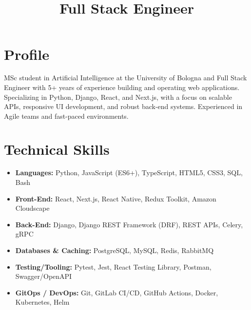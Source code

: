 \documentclass[11pt,a4paper,sans]{moderncv}
\title{Full Stack Engineer} %
\begin{document}
\makecvtitle

\vspace {-2em}

\section{Profile}
\vspace{-1mm}
MSc student in Artificial Intelligence at the University of Bologna and Full Stack Engineer with 5+ years of experience building and operating web applications. Specializing in Python, Django, React, and Next.js, with a focus on scalable APIs, responsive UI development, and robust back-end systems. Experienced in Agile teams and fast-paced environments.

    
    


\section{Technical Skills}
\begin{itemize}
    \item \textbf{Languages:} Python, JavaScript (ES6+), TypeScript, HTML5, CSS3, SQL, Bash
    \item \textbf{Front-End:} React, Next.js, React Native, Redux Toolkit, Amazon Cloudscape
    \item \textbf{Back-End:} Django, Django REST Framework (DRF), REST APIs, Celery, gRPC
    \item \textbf{Databases \& Caching:} PostgreSQL, MySQL, Redis, RabbitMQ
    \item \textbf{Testing/Tooling:} Pytest, Jest, React Testing Library, Postman, Swagger/OpenAPI
    \item \textbf{GitOps / DevOps:} Git, GitLab CI/CD, GitHub Actions, Docker, Kubernetes, Helm
\end{itemize}
\end{document}
